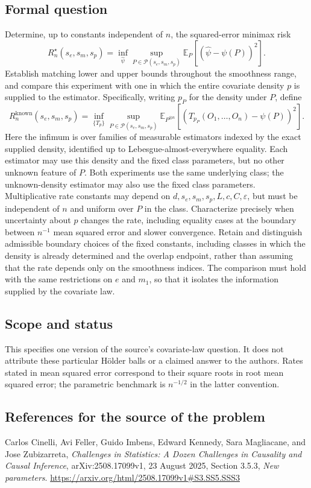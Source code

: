 \documentclass[11pt,a4paper]{article}
\newcommand{\E}{\mathbb E}
\begin{document}
\subsection*{Formal question}
Determine, up to constants independent of $n$, the squared-error minimax risk
\[
 R_n^\star(s_e,s_m,s_p)
 =\inf_{\widehat\psi}\sup_{P\in\mathcal P(s_e,s_m,s_p)}
 \E_P[(\widehat\psi-\psi(P))^2].
\]
Establish matching lower and upper bounds throughout the smoothness range, and compare this experiment with one in which the entire covariate density $p$ is supplied to the estimator. Specifically, writing $p_P$ for the density under $P$, define
\[
 R_n^{\mathrm{known}}(s_e,s_m,s_p)
 =\inf_{\{T_p\}}\sup_{P\in\mathcal P(s_e,s_m,s_p)}
 \E_{P^{\otimes n}}[(T_{p_P}(O_1,\ldots,O_n)-\psi(P))^2].
\]
Here the infimum is over families of measurable estimators indexed by the exact supplied density, identified up to Lebesgue-almost-everywhere equality. Each estimator may use this density and the fixed class parameters, but no other unknown feature of $P$. Both experiments use the same underlying class; the unknown-density estimator may also use the fixed class parameters. Multiplicative rate constants may depend on $d,s_e,s_m,s_p,L,c,C,\varepsilon$, but must be independent of $n$ and uniform over $P$ in the class. Characterize precisely when uncertainty about $p$ changes the rate, including equality cases at the boundary between $n^{-1}$ mean squared error and slower convergence. Retain and distinguish admissible boundary choices of the fixed constants, including classes in which the density is already determined and the overlap endpoint, rather than assuming that the rate depends only on the smoothness indices. The comparison must hold with the same restrictions on $e$ and $m_1$, so that it isolates the information supplied by the covariate law.
\subsection*{Scope and status}
This specifies one version of the source's covariate-law question. It does not attribute these particular Hölder balls or a claimed answer to the authors. Rates stated in mean squared error correspond to their square roots in root mean squared error; the parametric benchmark is $n^{-1/2}$ in the latter convention.
\subsection*{References for the source of the problem}
Carlos Cinelli, Avi Feller, Guido Imbens, Edward Kennedy, Sara Magliacane, and Jose Zubizarreta, \emph{Challenges in Statistics: A Dozen Challenges in Causality and Causal Inference}, arXiv:2508.17099v1, 23 August 2025, Section 3.5.3, \emph{New parameters}.
\url{https://arxiv.org/html/2508.17099v1#S3.SS5.SSS3}
\end{document}
